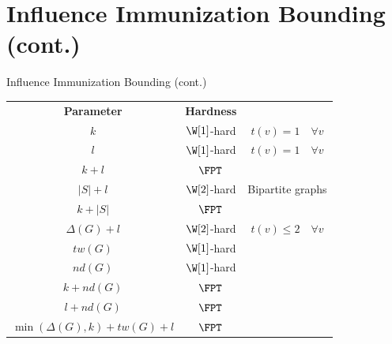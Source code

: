 \documentclass[10pt,aspectratio=169,english]{beamer}
\begin{document}
\section{Influence Immunization Bounding (cont.)}

\begin{frame}{Influence Immunization Bounding (cont.)}
	\begin{center}
		\begin{tabular}{ c | c  c }
			\textbf{Parameter} & \textbf{Hardness} & \\
			$k$ & $\W[1]$-hard & $t(v)=1 \quad \forall v$ \\
			$l$ & $\W[1]$-hard & $t(v)=1 \quad \forall v$ \\
			$k+l$ & $\FPT$ &  \\
			$|S| + l$ & $\W[2]$-hard & Bipartite graphs \\
			$k+|S|$ & $\FPT$ & \\
			$\Delta(G) + l$ & $\W[2]$-hard & $t(v) \leq 2 \quad \forall v$ \\
			$tw(G)$ & $\W[1]$-hard & \\
			$nd(G)$ & $\W[1]$-hard & \\
			$k+nd(G)$ & $\FPT$ & \\
			$l+nd(G)$ & $\FPT$ & \\
			$\min(\Delta(G), k)+tw(G)+l$ & $\FPT$ & \\
		\end{tabular}
	\end{center}
	
	
	
\end{frame}
\end{document}
